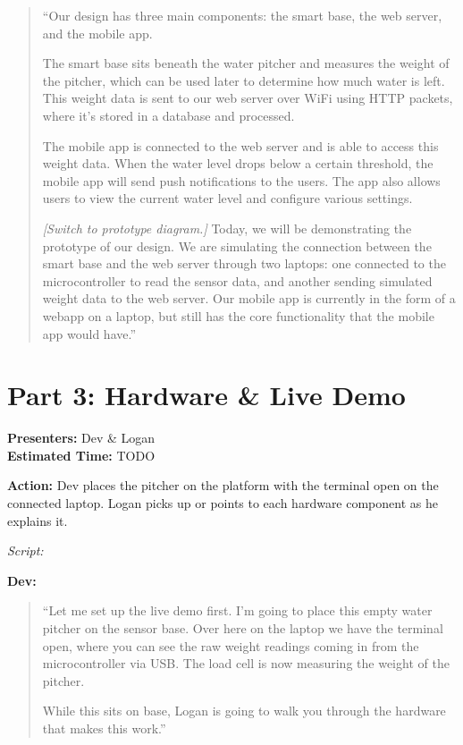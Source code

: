 \documentclass[12pt]{article}
\begin{document}
\begin{quote}
``Our design has three main components: the smart base, the web server, and the mobile app.

The smart base sits beneath the water pitcher and measures the weight of the pitcher, which can be used later to determine how much water is left. This weight data is sent to our web server over WiFi using HTTP packets, where it's stored in a database and processed. 

The mobile app is connected to the web server and is able to access this weight data. When the water level drops below a certain threshold, the mobile app will send push notifications to the users. The app also allows users to view the current water level and configure various settings.

\textit{[Switch to prototype diagram.]}
Today, we will be demonstrating the prototype of our design. We are simulating the connection between the smart base and the web server through two laptops: one connected to the microcontroller to read the sensor data, and another sending simulated weight data to the web server. Our mobile app is currently in the form of a webapp on a laptop, but still has the core functionality that the mobile app would have.'' 

\end{quote}


\section*{Part 3: Hardware \& Live Demo}
\noindent\textbf{Presenters:} Dev \& Logan\\  
\noindent\textbf{Estimated Time:} TODO

\noindent\textbf{Action:} Dev places the pitcher on the platform with the terminal open on the connected laptop. Logan picks up or points to each hardware component as he explains it.

\bigskip
\noindent\textit{Script:}

\medskip
\noindent\textbf{Dev:}
\begin{quote}
``Let me set up the live demo first. I'm going to place this empty water pitcher on the sensor base. Over here on the laptop we have the terminal open, where you can see the raw weight readings coming in from the microcontroller via USB. The load cell is now measuring the weight of the pitcher.

While this sits on base, Logan is going to walk you through the hardware that makes this work.''
\end{quote}
\end{document}
